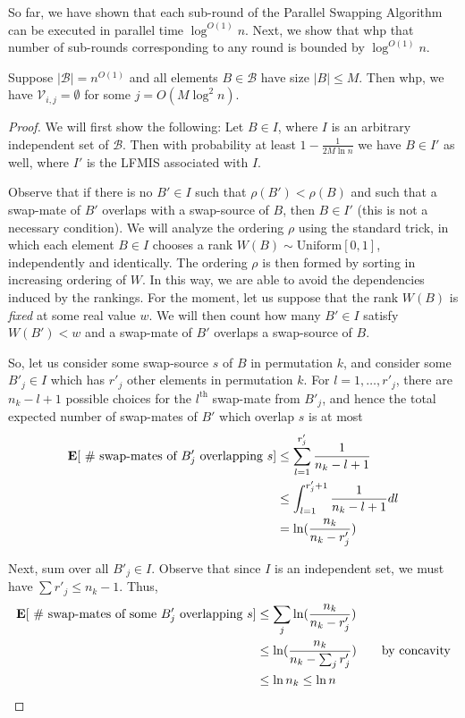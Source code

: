 So far, we have shown that each sub-round of the Parallel Swapping Algorithm can be executed in parallel time $\log^{O(1)} n$. Next, we show that whp that number of sub-rounds corresponding to any round is bounded by $\log^{O(1)} n$.


\begin{proposition}
Suppose $|\mathcal B| = n^{O(1)}$ and all elements $B \in \mathcal B$ have size $|B| \leq M$. Then whp, we have $\mathcal V_{i,j} = \emptyset$ for some $j = O(M \log^2 n)$.
\end{proposition}
\begin{proof}
We will first show the following: Let $B \in I$, where $I$ is an arbitrary independent set of $\mathcal B$. Then with probability at least $1 - \frac{1}{2 M \ln n}$ we have $B \in I'$ as well, where $I'$ is the LFMIS associated with $I$.

Observe that if there is no $B' \in I$ such that $\rho(B') < \rho(B)$ and such that a swap-mate of $B'$ overlaps with a swap-source of $B$, then $B \in I'$ (this is not a necessary condition). We will analyze the ordering $\rho$ using the standard trick, in which each element $B \in I$ chooses a rank $W(B) \sim \text{Uniform}[0,1]$, independently and identically. The ordering $\rho$ is then formed by sorting in increasing ordering of $W$. In this way, we are able to avoid the dependencies induced by the rankings. For the moment, let us suppose that the rank $W(B)$ is \emph{fixed} at some real value $w$. We will then count how many $B' \in I$ satisfy $W(B') < w$ and a swap-mate of $B'$ overlaps a swap-source of $B$.

So, let us consider some swap-source $s$ of $B$ in permutation $k$, and consider some $B'_j \in I$ which has $r'_j$ other elements in permutation $k$. For $l = 1, \dots, r'_j$, there are $n_k - l + 1$ possible choices for the $l^{\text{th}}$ swap-mate from $B'_j$, and hence the total expected number of swap-mates of $B'$ which overlap $s$ is at most
\begin{align*}
\mathbf{E}[ \text{ \# swap-mates of $B'_j$ overlapping $s$} ] &\leq \sum_{l=1}^{r'_j} \frac{1}{n_k - l + 1} \\
&\leq \int_{l=1}^{r'_j+1} \frac{1}{n_k - l + 1} dl \\
&=\ln (\frac{n_k}{n_k-r'_j})
\end{align*}

Next, sum over all $B'_j \in I$. Observe that since $I$ is an independent set, we must have $\sum r'_j \leq n_k-1$. Thus, 
\begin{align*}
\mathbf{E}[ \text{ \# swap-mates of some $B'_j$ overlapping $s$} ] &\leq \sum_j \ln(\frac{n_k}{n_k-r'_j}) \\
 &\leq \ln(\frac{n_k}{n_k-\sum_j r'_j}) \qquad \text{by concavity} \\
 &\leq \ln n_k \leq \ln n \\
\end{align*}


\end{proof}
